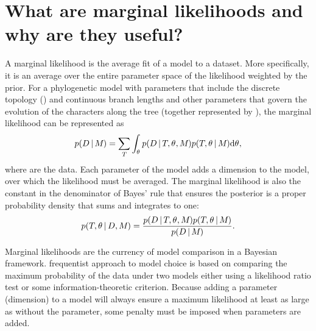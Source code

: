 \section{What are marginal likelihoods and why are they useful?}

\begin{linenomath}
A marginal likelihood is the average fit of a model to a dataset.
More specifically, it is an average over the entire parameter space of the
likelihood weighted by the prior.
For a phylogenetic model \model with parameters that include the discrete
topology (\topology) and continuous branch lengths and other parameters that
govern the evolution of the characters along the tree (together represented by
\evoparameters), the marginal likelihood can be represented as
\begin{equation}
    p(D \,|\, M_{}) =
    \sum\limits_{T_{}}
    \int_{\theta_{}}
    p( D \,|\, T_{}, \theta_{}, M_{})
    p(T_{}, \theta_{} \,|\, M_{})
    \mathrm{d}\theta_{},
    \label{eq:marginalLikelihood}
\end{equation}
where \data are the data.
Each parameter of the model adds a dimension to the model, over which the
likelihood must be averaged.
The marginal likelihood is also the 
constant in the denominator of Bayes' rule that ensures the posterior is a
proper probability density that sums and integrates to one:
\begin{equation}
    p(T_{}, \theta_{} \,|\, D, M_{}) = \frac{
        p(D \,|\, T_{}, \theta_{}, M_{})
        p(T_{}, \theta_{} \,|\, M_{})
    }{
        p(D \,|\, M_{})
    }.
    \label{eq:bayesRule}
\end{equation}
\end{linenomath}


Marginal likelihoods are the currency of model comparison in a Bayesian
framework.
 frequentist approach to model
choice is based on comparing the maximum probability  of the
data under two models either using a likelihood ratio test or some
information-theoretic criterion.
Because adding a parameter (dimension) to a model will always ensure
a maximum likelihood at least as large as without the parameter, some
penalty must be imposed when parameters are added.

